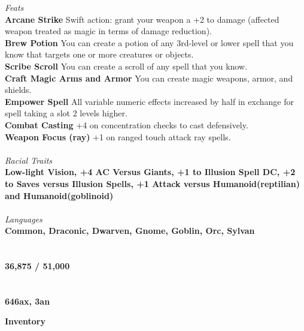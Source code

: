 \documentclass[letterpaper]{article}
\begin{document}
\noindent\emph{Feats} \\
\noindent\textbf{Arcane Strike} Swift action: grant your weapon a +2 to damage (affected weapon treated as magic in terms of damage reduction). \\
\noindent\textbf{Brew Potion} You can create a potion of any 3rd-level or lower spell that you know that targets one or more creatures or objects. \\
\noindent\textbf{Scribe Scroll} You can create a scroll of any spell that you know. \\
\noindent\textbf{Craft Magic Arms and Armor} You can create magic weapons, armor, and shields. \\
\noindent\textbf{Empower Spell} All variable numeric effects increased by half in exchange for spell taking a slot 2 levels higher. \\
\noindent\textbf{Combat Casting} +4 on concentration checks to cast defensively. \\
\noindent\textbf{Weapon Focus (ray)} +1 on ranged touch attack ray spells. \\
\\
\noindent\emph{Racial Traits} \\
\textbf{Low-light Vision, +4 AC Versus Giants, +1 to Illusion Spell DC, +2 to Saves versus Illusion Spells, +1 Attack versus Humanoid(reptilian) and Humanoid(goblinoid)} \\
\\
\noindent\emph{Languages} \\
\textbf{Common, Draconic, Dwarven, Gnome, Goblin, Orc, Sylvan} \\
\\
 \\
\textbf{36,875 / 51,000} \\
\\
 \\
\textbf{646ax, 3an} \\

\pagebreak

\noindent \textbf{\huge{Inventory}} \\
\end{document}
